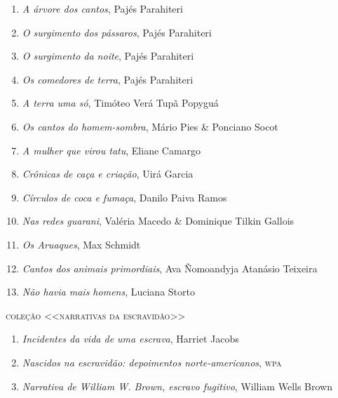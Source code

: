 \begin{enumerate}
\setlength\parskip{4.2pt}
\setlength\itemsep{-1.4mm}
\item \textit{A árvore dos cantos}, Pajés Parahiteri
\item \textit{O surgimento dos pássaros}, Pajés Parahiteri
\item \textit{O surgimento da noite}, Pajés Parahiteri
\item \textit{Os comedores de terra}, Pajés Parahiteri
\item \textit{A terra uma só}, Timóteo Verá Tupã Popyguá
\item \textit{Os cantos do homem-sombra}, Mário Pies \& Ponciano Socot
\item \textit{A mulher que virou tatu}, Eliane Camargo
\item \textit{Crônicas de caça e criação}, Uirá Garcia
\item \textit{Círculos de coca e fumaça}, Danilo Paiva Ramos
\item \textit{Nas redes guarani}, Valéria Macedo \& Dominique Tilkin Gallois
\item \textit{Os Aruaques}, Max Schmidt
\item \textit{Cantos dos animais primordiais}, Ava Ñomoandyja Atanásio Teixeira
\item \textit{Não havia mais homens}, Luciana Storto
\end{enumerate}



\medskip
{\large\textsc{coleção <<narrativas da escravidão>>}}

\begin{enumerate}
\setlength\parskip{4.2pt}
\setlength\itemsep{-1.4mm}
\item \textit{Incidentes da vida de uma escrava}, Harriet Jacobs
\item \textit{Nascidos na escravidão: depoimentos norte-americanos}, \textsc{wpa}
\item \textit{Narrativa de William W. Brown, escravo fugitivo}, William Wells Brown
\end{enumerate}

